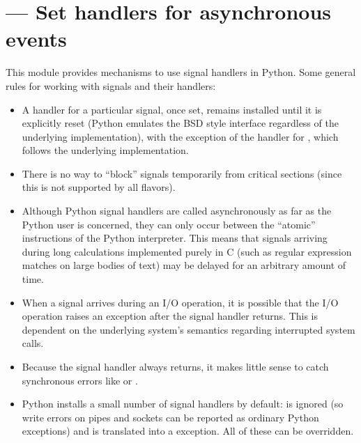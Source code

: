 \section{ ---
         Set handlers for asynchronous events}



This module provides mechanisms to use signal handlers in Python.
Some general rules for working with signals and their handlers:

\begin{itemize}

\item
A handler for a particular signal, once set, remains installed until
it is explicitly reset (Python emulates the BSD style interface
regardless of the underlying implementation), with the exception of
the handler for , which follows the underlying
implementation.

\item
There is no way to ``block'' signals temporarily from critical
sections (since this is not supported by all \UNIX{} flavors).

\item
Although Python signal handlers are called asynchronously as far as
the Python user is concerned, they can only occur between the
``atomic'' instructions of the Python interpreter.  This means that
signals arriving during long calculations implemented purely in C
(such as regular expression matches on large bodies of text) may be
delayed for an arbitrary amount of time.

\item
When a signal arrives during an I/O operation, it is possible that the
I/O operation raises an exception after the signal handler returns.
This is dependent on the underlying \UNIX{} system's semantics regarding
interrupted system calls.

\item
Because the \C{} signal handler always returns, it makes little sense to
catch synchronous errors like  or .

\item
Python installs a small number of signal handlers by default:
 is ignored (so write errors on pipes and sockets can be
reported as ordinary Python exceptions) and  is translated
into a  exception.  All of these can be
overridden.


\end{itemize}
